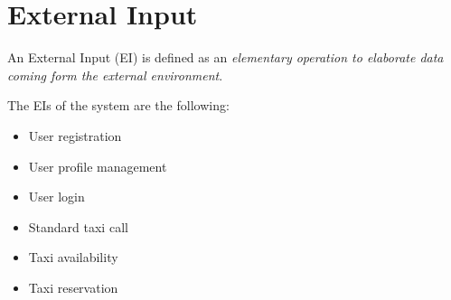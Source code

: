 \section{External Input}
An External Input (EI) is defined as an \emph{elementary operation to elaborate data coming form the external environment}.

The EIs of the system are the following:
\begin{itemize}
	\item User registration
	\item User profile management
	\item User login
	\item Standard taxi call
	\item Taxi availability
	\item Taxi reservation
\end{itemize}
